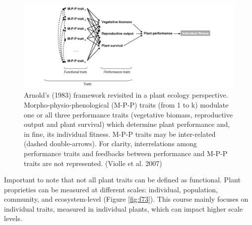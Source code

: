 \documentclass[12pt,oneside]{book}
\begin{document}
\begin{figure}

{\centering \includegraphics[width=0.8\linewidth]{figures/chap7/f72_violle} 

}

\caption{Arnold’s (1983) framework revisited in a plant ecology perspective. Morpho-physio-phenological (M-P-P) traits (from 1 to k) modulate one or all three performance traits (vegetative biomass, reproductive output and plant survival) which determine plant performance and, in fine, its individual fitness. M-P-P traits may be inter-related (dashed double-arrows). For clarity, interrelations among performance traits and feedbacks between performance and M-P-P traits are not represented. (Violle et al. 2007)}\label{fig:f72}
\end{figure}

Important to note that not all plant traits can be defined as
functional. Plant proprieties can be measured at different scales:
individual, population, community, and ecosystem-level (Figure
\ref{fig:f73}). This course mainly focuses on individual traits,
measured in individual plants, which can impact higher scale levels.
\end{document}
